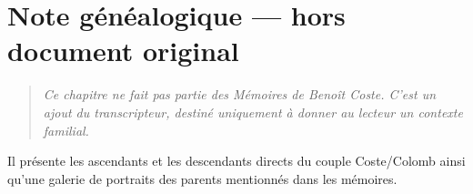 
\chapter*{Note généalogique --- hors document original}

\begin{quote}
\textit{Ce chapitre ne fait pas partie des Mémoires de Benoît Coste. C'est un
ajout du transcripteur, destiné uniquement à donner au lecteur un contexte
familial.}
\end{quote}

Il présente les ascendants et les descendants directs du couple Coste/Colomb
ainsi qu'une galerie de portraits des parents mentionnés dans les mémoires.



